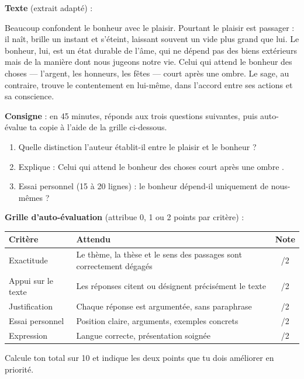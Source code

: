 \documentclass[11pt]{article}
\begin{document}
\begin{exercice}
\textbf{Texte} (extrait adapté) :

\og Beaucoup confondent le bonheur avec le plaisir. Pourtant le plaisir est passager : il naît, brille un instant et s'éteint, laissant souvent un vide plus grand que lui. Le bonheur, lui, est un état durable de l'âme, qui ne dépend pas des biens extérieurs mais de la manière dont nous jugeons notre vie. Celui qui attend le bonheur des choses — l'argent, les honneurs, les fêtes — court après une ombre. Le sage, au contraire, trouve le contentement en lui-même, dans l'accord entre ses actions et sa conscience. \fg

\textbf{Consigne} : en 45 minutes, réponds aux trois questions suivantes, puis auto-évalue ta copie à l'aide de la grille ci-dessous.
\begin{enumerate}
\item Quelle distinction l'auteur établit-il entre le plaisir et le bonheur ?
\item Explique : \og Celui qui attend le bonheur des choses court après une ombre \fg.
\item Essai personnel (15 à 20 lignes) : le bonheur dépend-il uniquement de nous-mêmes ?
\end{enumerate}

\textbf{Grille d'auto-évaluation} (attribue 0, 1 ou 2 points par critère) :

\begin{center}
\begin{tabularx}{\linewidth}{|l|X|c|}\hline
\rowcolor{popblueL} \textbf{Critère} & \textbf{Attendu} & \textbf{Note} \\ \hline
Exactitude & Le thème, la thèse et le sens des passages sont correctement dégagés & /2 \\ \hline
Appui sur le texte & Les réponses citent ou désignent précisément le texte & /2 \\ \hline
Justification & Chaque réponse est argumentée, sans paraphrase & /2 \\ \hline
Essai personnel & Position claire, arguments, exemples concrets & /2 \\ \hline
Expression & Langue correcte, présentation soignée & /2 \\ \hline
\end{tabularx}
\end{center}

Calcule ton total sur 10 et indique les deux points que tu dois améliorer en priorité.
\end{exercice}
\end{document}
